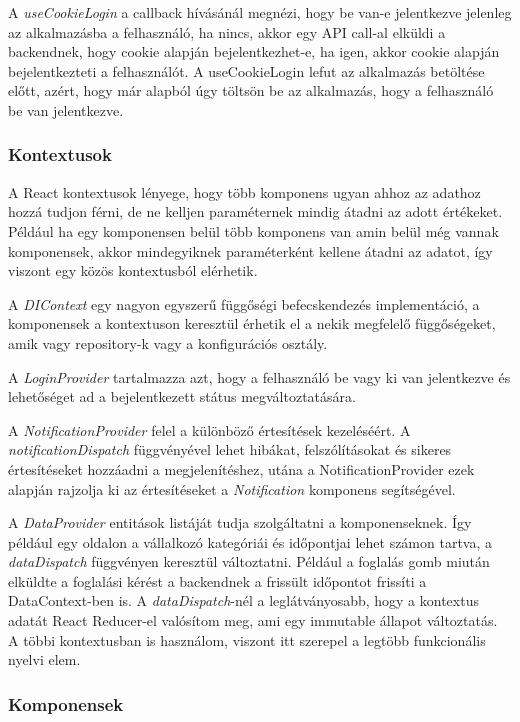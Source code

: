 A \textit{useCookieLogin} a callback hívásánál megnézi, hogy be van-e jelentkezve jelenleg az alkalmazásba a felhasználó, ha nincs, akkor egy API call-al elküldi a backendnek, hogy cookie alapján bejelentkezhet-e, ha igen, akkor cookie alapján bejelentkezteti a felhasználót. A useCookieLogin lefut az alkalmazás betöltése előtt, azért, hogy már alapból úgy töltsön be az alkalmazás, hogy a felhasználó be van jelentkezve.

\subsubsection{Kontextusok}

A React kontextusok lényege, hogy több komponens ugyan ahhoz az adathoz hozzá tudjon férni, de ne kelljen paraméternek mindig átadni az adott értékeket. Például ha egy komponensen belül több komponens van amin belül még vannak komponensek, akkor mindegyiknek paraméterként kellene átadni az adatot, így viszont egy közös kontextusból elérhetik.

A \textit{DIContext} egy nagyon egyszerű függőségi befecskendezés implementáció, a komponensek a kontextuson keresztül érhetik el a nekik megfelelő függőségeket, amik vagy repository-k vagy a konfigurációs osztály.

A \textit{LoginProvider} tartalmazza azt, hogy a felhasználó be vagy ki van jelentkezve és lehetőséget ad a bejelentkezett státus megváltoztatására.

A \textit{NotificationProvider} felel a különböző értesítések kezeléséért. A \textit{notificationDispatch} függvényével lehet hibákat, felszólításokat és sikeres értesítéseket hozzáadni a megjelenítéshez, utána a NotificationProvider ezek alapján rajzolja ki az értesítéseket a \textit{Notification} komponens segítségével.

A \textit{DataProvider} entitások listáját tudja szolgáltatni a komponenseknek. Így például egy oldalon a vállalkozó kategóriái és időpontjai lehet számon tartva, a \textit{dataDispatch} függvényen keresztül változtatni. Például a foglalás gomb miután elküldte a foglalási kérést a backendnek a frissült időpontot frissíti a DataContext-ben is. A \textit{dataDispatch}-nél a leglátványosabb, hogy a kontextus adatát  React Reducer-el valósítom meg, ami egy immutable állapot változtatás. A többi kontextusban is használom, viszont itt szerepel a legtöbb funkcionális nyelvi elem. 

\subsubsection{Komponensek}

